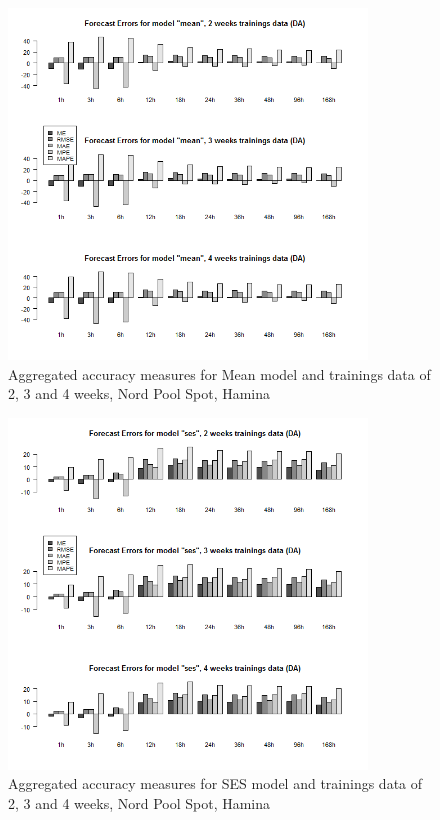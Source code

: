 \begin{figure}[!ht]
	\centering
		\includegraphics[width=0.85\textwidth]{figures/appendix_forecast_results/da_sim_1_x_1w_1w_mean.png}
	\caption{Aggregated accuracy measures for Mean model and trainings data of 2, 3 and 4 weeks, Nord
Pool Spot, Hamina}
	\label{fig:app_da_sim_1_x_1w_1w_mean}
\end{figure}



\begin{figure}[!ht]
	\centering
	\vspace*{-1.2in}
		\includegraphics[width=0.85\textwidth]{figures/appendix_forecast_results/da_sim_1_x_1w_1w_ses.png}
	\caption{Aggregated accuracy measures for SES model and trainings data of 2, 3 and 4 weeks, Nord
Pool Spot, Hamina}
	\label{fig:app_da_sim_1_x_1w_1w_ses}
\end{figure}

